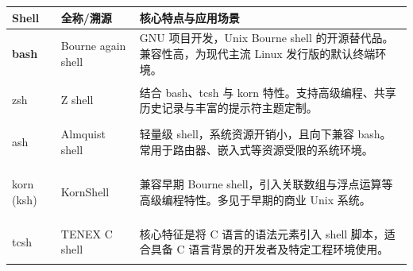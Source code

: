 \documentclass[border=15pt]{standalone}
\begin{document}
\sffamily

\renewcommand{\arraystretch}{1.5}

\begin{tabularx}{16cm}{>{\bfseries}p{2.5cm} p{4cm} X}
	\rowcolor{headerbg}
	\toprule
	\textcolor{headertext}{\textbf{Shell}} & \textcolor{headertext}{\textbf{全称/溯源}} & \textcolor{headertext}{\textbf{核心特点与应用场景}}                     \\
	\midrule

	bash                                   & Bourne again shell                     & GNU 项目开发，Unix Bourne shell 的开源替代品。兼容性高，为现代主流 Linux 发行版的默认终端环境。 \\
	\addlinespace[0.5ex]

	zsh                                    & Z shell                                & 结合 bash、tcsh 与 korn 特性。支持高级编程、共享历史记录与丰富的提示符主题定制。               \\
	\addlinespace[0.5ex]

	ash                                    & Almquist shell                         & 轻量级 shell，系统资源开销小，且向下兼容 bash。常用于路由器、嵌入式等资源受限的系统环境。             \\
	\addlinespace[0.5ex]

	korn (ksh)                             & KornShell                              & 兼容早期 Bourne shell，引入关联数组与浮点运算等高级编程特性。多见于早期的商业 Unix 系统。         \\
	\addlinespace[0.5ex]

	tcsh                                   & TENEX C shell                          & 核心特征是将 C 语言的语法元素引入 shell 脚本，适合具备 C 语言背景的开发者及特定工程环境使用。          \\

	\bottomrule
\end{tabularx}
\end{document}
